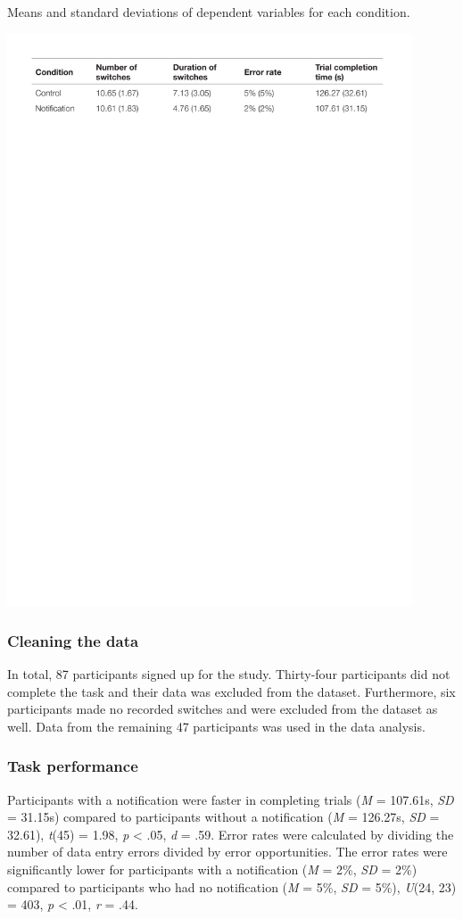 \begin{table}
\caption{Means and standard deviations of dependent variables for each condition.}
\centering
\includegraphics[width=0.9\textwidth]{images/ch56/ch56-descstats.pdf}
\vspace{-3pt}
\label{tbl:ch56-Table1}
\end{table}

\subsubsection{Cleaning the data}
In total, 87 participants signed up for the study. Thirty-four participants did not complete the task and their data was excluded from the dataset.
Furthermore, six participants made no recorded switches and were excluded from the dataset as well. Data from the remaining 47 participants was used in the data analysis.

\subsubsection{Task performance}
Participants with a notification were faster in completing trials (\textit{M} = 107.61s, \textit{SD} = 31.15s) compared to participants without a notification (\textit{M} = 126.27s, \textit{SD} = 32.61), \textit{t}(45) = 1.98, \textit{p} < .05, \textit{d} = .59.
Error rates were calculated by dividing the number of data entry errors divided by error opportunities. The error rates were significantly lower for participants with a notification (\textit{M }= 2\%, \textit{SD} = 2\%) compared to participants who had no notification (\textit{M} = 5\%, \textit{SD }= 5\%), \textit{U}(24, 23) = 403, \textit{p} < .01, \textit{r} = .44. 


